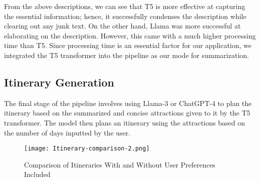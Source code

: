 \documentclass[final,3p,times,authoryear]{elsarticle}
\begin{document}
    From the above descriptions, we can see that T5 is more effective at capturing the essential information; hence, it successfully condenses the description while clearing out any junk text. On the other hand, Llama was more successful at elaborating on the description. However, this came with a much higher processing time than T5. Since processing time is an essential factor for our application, we integrated the T5 transformer into the pipeline as our mode for summarization.
    
    \vspace{-7pt}
    
    \subsection{Itinerary Generation}
        The final stage of the pipeline involves using Llama-3 or ChatGPT-4 to plan the itinerary based on the summarized and concise attractions given to it by the T5 transformer. The model then plans an itinerary using the attractions based on the number of days inputted by the user.
        

        \newpage
        
        \begin{figure}[H]
            \centering
            \texttt{[image: Itinerary-comparison-2.png]}
            \caption{Comparison of Itineraries With and Without User Preferences Included}
            \label{fig:itinerary_comparison}
        \end{figure}
        
        \vspace{-7pt}
        
\end{document}
